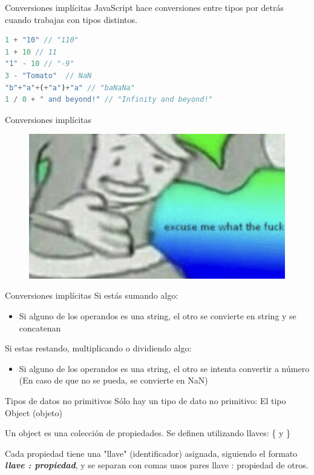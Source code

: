 \documentclass{beamer}
\begin{document}
\begin{frame}[fragile]{Conversiones implícitas}
JavaScript hace conversiones entre tipos por detrás cuando trabajas con tipos distintos.

\begin{lstlisting}[language=JavaScript]
1 + "10" // "110"
1 + 10 // 11
"1" - 10 // "-9"
3 - "Tomato"  // NaN
"b"+"a"+(+"a")+"a" // "baNaNa"
1 / 0 + " and beyond!" // "Infinity and beyond!"
\end{lstlisting}
\end{frame}

\begin{frame}{Conversiones implícitas}
    \begin{figure}
        \centering
        \includegraphics[width=\textwidth]{images/excuse_me.jpg}
    \end{figure}
\end{frame}

\begin{frame}{Conversiones implícitas}
Si estás sumando algo:
\begin{itemize}
    \item Si alguno de los operandos es una string, el otro se convierte en string y se concatenan
\end{itemize}

Si estas restando, multiplicando o dividiendo algo:
\begin{itemize}
    \item Si alguno de los operandos es una string, el otro se intenta convertir a número (En caso de que no se pueda, se convierte en NaN)
\end{itemize}
\end{frame}

\begin{frame}{Tipos de datos no primitivos}
Sólo hay un tipo de dato no primitivo: El tipo Object (objeto)

Un object es una colección de propiedades. Se definen utilizando llaves: \{ y \}

Cada propiedad tiene una "llave" (identificador) asignada, siguiendo el formato \textbf{\textit{llave : propiedad}}, y se separan con comas unos pares llave : propiedad de otros.
\end{frame}
\end{document}
